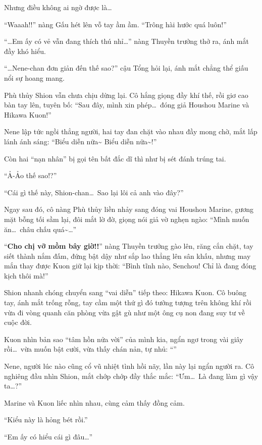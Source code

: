 \documentclass[../main.tex]{subfiles}
\begin{document}
Nhưng điều không ai ngờ được là\dots

``Waaah!!'' nàng Gấu hét lên vỗ tay ầm ầm. ``Trông hài hước quá luôn!''

``\dots Em ấy có vẻ vẫn đang thích thú nhỉ\dots'' nàng Thuyền trưởng thở ra, ánh mắt đầy khó hiểu.

``\dots Nene-chan đơn giản đến thế sao?'' cậu Tổng hỏi lại, ánh mắt chẳng thể giấu nổi sự hoang mang.

Phù thủy Shion vẫn chưa chịu dừng lại. Cô hắng giọng đầy khí thế, rồi giơ cao bàn tay lên, tuyên bố: ``Sau đây, mình xin phép\dots\ đóng giả Houshou Marine và Hikawa Kuon!''

Nene lập tức ngồi thẳng người, hai tay đan chặt vào nhau đầy mong chờ, mắt lấp lánh ánh sáng: ``Biểu diễn nữa\~{} Biểu diễn nữa\~{}!''

Còn hai ``nạn nhân'' bị gọi tên bất đắc dĩ thì như bị sét đánh trúng tai.

``Ả-Ảo thế sao!?''

``Cái gì thế này, Shion-chan\dots\ Sao lại lôi cả anh vào đây?''

Ngay sau đó, cô nàng Phù thủy liền nhảy sang đóng vai Houshou Marine, gương mặt bỗng tối sầm lại, đôi mắt lờ đờ, giọng nói giả vờ nghẹn ngào: ``Mình muốn ăn\dots\ châu chấu quá\~{}\dots''

``\textbf{Cho chị vỡ mồm bây giờ!!}'' nàng Thuyền trưởng gào lên, răng cắn chặt, tay siết thành nắm đấm, đứng bật dậy như sắp lao thẳng lên sân khấu, nhưng may mắn thay được Kuon giữ lại kịp thời: ``Bình tĩnh nào, Senchou! Chỉ là đang đóng kịch thôi mà!''

Shion nhanh chóng chuyển sang ``vai diễn'' tiếp theo: Hikawa Kuon. Cô buông tay, ánh mắt trống rỗng, tay cầm một thứ gì đó tưởng tượng trên không khí rồi vừa đi vòng quanh căn phòng vừa gật gù như một ông cụ non đang suy tư về cuộc đời.

Kuon nhìn bản sao ``tâm hồn nửa vời'' của mình kia, ngẩn ngơ trong vài giây rồi\dots\ vừa muốn bật cười, vừa thấy chán nản, tự nhủ: ``''

Nene, người lúc nào cũng cổ vũ nhiệt tình hồi nãy, lần này lại ngẩn người ra. Cô nghiêng đầu nhìn Shion, mắt chớp chớp đầy thắc mắc: ``Ưm\dots\ Là đang làm gì vậy ta\dots?''

Marine và Kuon liếc nhìn nhau, cùng cảm thấy đồng cảm.

``Kiểu này là hỏng bét rồi.''

``Em ấy có hiểu cái gì đâu\dots''
\end{document}
